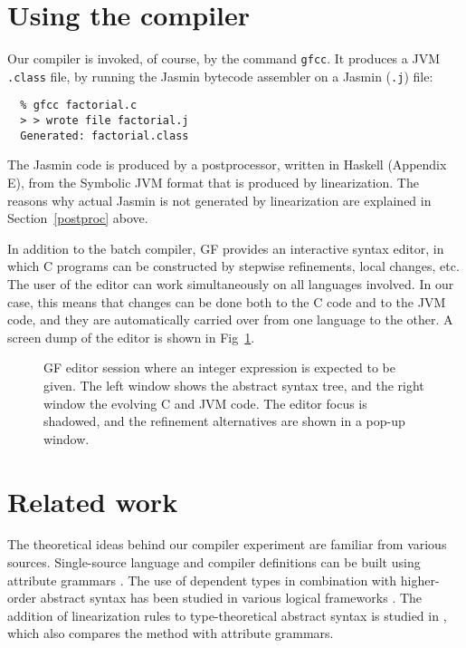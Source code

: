 \documentclass[12pt]{article}
\begin{document}
\section{Using the compiler}

Our compiler is invoked, of course, by the command \texttt{gfcc}.
It produces a JVM \texttt{.class} file, by running the
Jasmin bytecode assembler \cite{jasmin} on a Jasmin (\texttt{.j})
file:
\begin{verbatim}
  % gfcc factorial.c
  > > wrote file factorial.j
  Generated: factorial.class
\end{verbatim}
The Jasmin code is produced by a postprocessor, written in Haskell
(Appendix E), from the Symbolic JVM format that is produced by
linearization. The reasons why actual Jasmin is not generated
by linearization are explained in Section~\ref{postproc} above.

In addition to the batch compiler, GF provides an interactive 
syntax editor, in which C programs can be constructed by
stepwise refinements, local changes, etc. The user of the
editor can work simultaneously on all languages involved.
In our case, this means that changes can be done both to
the C code and to the JVM code, and they are automatically
carried over from one language to the other.
A screen dump of the editor is shown in Fig~\ref{demo}.

\begin{figure}
\centerline{} \caption{
GF editor session where an integer
expression is expected to be given. The left window shows the
abstract syntax tree, and the right window the evolving C and
JVM code. The editor focus is shadowed, and the refinement alternatives
are shown in a pop-up window.
}
\label{demo}
\end{figure}



\section{Related work}

The theoretical ideas behind our compiler experiment
are familiar from various sources.
Single-source language and compiler definitions
can be built using attribute grammars \cite{knuth-attr}.
The use of
dependent types in combination with higher-order abstract syntax
has been studied in various logical frameworks 
\cite{harper-honsell,magnusson-nordstr,twelf}.
The addition of linearization rules to type-theoretical 
abstract syntax is studied in \cite{semBNF}, which also 
compares the method with attribute grammars.
\end{document}
